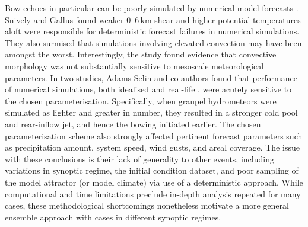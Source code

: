 \documentclass{ametsoc}
\begin{document}
Bow echoes in particular can be poorly simulated by numerical model forecasts \citep{Keene2013-df;Snively2014-pr}. Snively and Gallus found weaker 0--6\,km shear and higher potential temperatures aloft were responsible for deterministic forecast failures in numerical simulations. They also surmised that simulations involving elevated convection may have been amongst the worst. Interestingly, the study found evidence that convective morphology was not substantially sensitive to mesoscale meteorological parameters. In two studies, Adams-Selin and co-authors found that performance of numerical simulations, both idealised \citeyearpar{Adams-Selin2013-ca} and real-life \citeyearpar{Adams-Selin2013-om}, were acutely sensitive to the chosen parameterisation. Specifically, when graupel hydrometeors were simulated as lighter and greater in number, they resulted in a stronger cold pool and rear-inflow jet, and hence the bowing initiated earlier. The chosen parameterisation scheme also strongly affected pertinent forecast parameters such as precipitation amount, system speed, wind gusts, and areal coverage. The issue with these conclusions is their lack of generality to other events, including variations in synoptic regime, the initial condition dataset, and poor sampling of the model attractor (or model climate) via use of a deterministic approach. While computational and time limitations preclude in-depth analysis repeated for many cases, these methodological shortcomings nonetheless motivate a more general ensemble approach with cases in different synoptic regimes.
\end{document}

